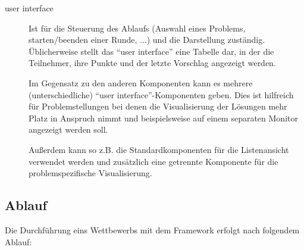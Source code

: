 \documentclass[a4paper, 12pt]{article}
\begin{document}
\begin{description}
  \item[user interface]
    Ist für die Steuerung des Ablaufs (Auswahl eines Problems, starten/beenden
    einer Runde, ...) und die Darstellung zuständig.
    Üblicherweise stellt das ``user interface'' eine Tabelle dar, in der die
    Teilnehmer, ihre Punkte und der letzte Vorschlag angezeigt werden.

    Im Gegensatz zu den anderen Komponenten kann es mehrere (unterschiedliche)
    ``user interface''-Komponenten geben.
    Dies ist hilfreich für Problemstellungen bei denen die Visualisierung der
    Lösungen mehr Platz in Anspruch nimmt und beispielsweise auf einem separaten
    Monitor angezeigt werden soll.

    Außerdem kann so z.B. die Standardkomponenten für die Listenansicht
    verwendet werden und zusätzlich eine getrennte Komponente für die
    problemspezifische Visualisierung.
\end{description}

\subsection{Ablauf}

Die Durchführung eins Wettbewerbs mit dem Framework erfolgt nach folgendem
Ablauf:
\end{document}
